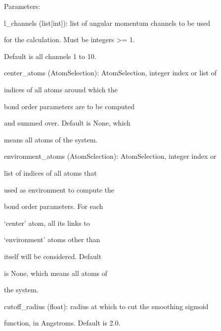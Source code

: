 \documentclass[letterpaper,10pt,english]{sphinxmanual}
\begin{document}
\begin{fulllineitems}
\begin{DUlineblock}{0em}
\item[] Parameters:
\item[]
\begin{DUlineblock}{\DUlineblockindent}
\item[] l\_channels (list{[}int{]}): list of angular momentum channels to be used
\item[]
\begin{DUlineblock}{\DUlineblockindent}
\item[] for the calculation. Must be integers \textgreater{}= 1.
\item[] Default is all channels 1 to 10.
\end{DUlineblock}
\item[] center\_atoms (AtomSelection): AtomSelection, integer index or list of
\item[]
\begin{DUlineblock}{\DUlineblockindent}
\item[] indices of all atoms around which the
\item[] bond order parameters are to be computed
\item[] and summed over. Default is None, which
\item[] means all atoms of the system.
\end{DUlineblock}
\item[] environment\_atoms (AtomSelection): AtomSelection, integer index or
\item[]
\begin{DUlineblock}{\DUlineblockindent}
\item[] list of indices of all atoms that
\item[] used as environment to compute the
\item[] bond order parameters. For each
\item[] `center' atom, all its links to
\item[] `environment' atoms other than
\item[] itself will be considered. Default
\item[] is None, which means all atoms of
\item[] the system.
\end{DUlineblock}
\item[] cutoff\_radius (float): radius at which to cut the smoothing sigmoid
\item[]
\begin{DUlineblock}{\DUlineblockindent}
\item[] function, in Angstroms. Default is 2.0.

\end{DUlineblock}
\end{DUlineblock}
\end{DUlineblock}
\end{fulllineitems}
\end{document}
